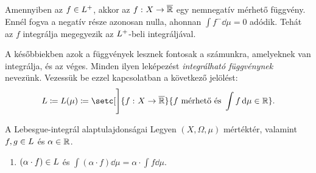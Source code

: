 \documentclass[
]{elteikthesis}[2024/04/26]
\begin{document}
	\noindent 
	Amennyiben az \( f \in L^+ \), 
	akkor az \( f \,\colon X \to \overline{\mathbb{R}} \) egy nemnegatív mérhető függvény.
	Ennél fogva a negatív része azonosan nulla, ahonnan \( \int f^- \dd{\mu} = 0 \) adódik.
	Tehát az \( f \) integrálja megegyezik az \( L^+ \)-beli integráljával.
	
	A későbbiekben azok a függvények lesznek fontosak a számunkra, 
	amelyeknek van integrálja, és az véges. 
	Minden ilyen leképezést \emph{integrálható függvénynek} nevezünk. 
	Vezessük be ezzel kapcsolatban a következő jelölést:
	\[
		\Lebesgue \coloneq \Lebesgue(\mu) \coloneq
		\setc[\Bigg]{ \func{f}{X}{\overline{\R}} }{ f \text{ mérhető és } \int f \dd{\mu} \in \R}.
	\]
	
	\begin{theorem}{A Lebesgue-integrál alaptulajdonságai}{}
		Legyen \( (X,\Omega,\mu) \) mértéktér, 
		valamint \( f, g \in \Lebesgue \) és \( \alpha \in \mathbb{R} \).
		\begin{enumerate}
			\item 
			\( (\alpha \cdot f) \in \Lebesgue \) 
			\quad és \quad 
			\( \displaystyle \int (\alpha \cdot f) \dd{\mu} = \alpha \cdot \int f \dd{\mu} \).
		\end{enumerate}
	\end{theorem}
		
\end{document}
